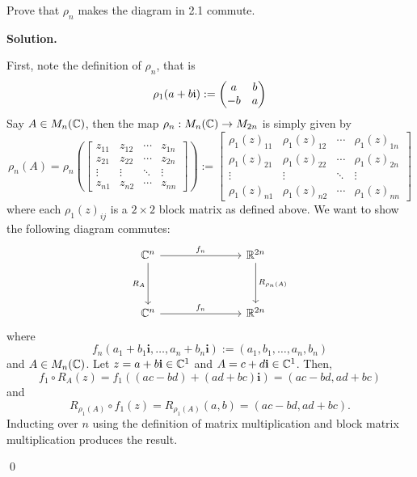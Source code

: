 \documentclass[12pt]{book}
\theoremstyle{definition}
\newenvironment{solution}
{%
  \par\noindent\textbf{Solution.}\quad
}
{%
  \qed\par
}
\begin{document}
\begin{taggedexercise}[\textcolor{green}{Complete}]
  Prove that $\rho_n$ makes the diagram in 2.1 commute.
\end{taggedexercise}

\begin{solution}
  First, note the definition of $\rho_n$, that is 
  \[\rho_1(a + b\mathfrak{i}) := \begin{pmatrix} a & b \\ -b & a \end{pmatrix}\]
  Say $A \in M_n(\mathbb{C})$, then the map $\rho_n : M_n(\mathbb{C}) \to M_{2n}$ is simply given by
  \[
\rho_n(A) = \rho_n \left(
\begin{bmatrix}
z_{11} & z_{12} & \cdots & z_{1n} \\
z_{21} & z_{22} & \cdots & z_{2n} \\
\vdots & \vdots & \ddots & \vdots \\
z_{n1} & z_{n2} & \cdots & z_{nn}
\end{bmatrix}\right) 
:= \begin{bmatrix}
  \rho_1(z)_{11} & \rho_1(z)_{12} & \cdots & \rho_1(z)_{1n} \\
  \rho_1(z)_{21} & \rho_1(z)_{22} & \cdots & \rho_1(z)_{2n} \\
  \vdots & \vdots & \ddots & \vdots \\
  \rho_1(z)_{n1} & \rho_1(z)_{n2} & \cdots & \rho_1(z)_{nn}
  \end{bmatrix}
\]
where each $\rho_1(z)_{ij}$ is a $2 \times 2$ block matrix as defined above.
We want to show the following diagram commutes:
\[\begin{tikzcd}
	{\C^n} &&& {\R^{2n}} \\
	\\
	{\C^n} &&& {\R^{2n}}
	\arrow["{f_n}", from=1-1, to=1-4]
	\arrow["{R_A}"', from=1-1, to=3-1]
	\arrow["{R_{\rho_{n}(A)}}", from=1-4, to=3-4]
	\arrow["{f_n}", from=3-1, to=3-4]
\end{tikzcd}\]
where
\[f_n(a_1 + b_1\mathbf{i}, \dots, a_n + b_n\mathbf{i}) := (a_1, b_1, \dots, a_n, b_n)\]
and $A \in M_n(\mathbb{C})$.
Let $z = a+b\mathbf{i} \in \mathbb{C}^1$ and $A = c+d\mathbf{i} \in \mathbb{C}^1$.
Then,
\[f_1 \circ R_A(z) = f_1 ((ac-bd) + (ad+bc)\mathbf{i}) = (ac-bd, ad+bc)\]
and
\[R_{\rho_{1}(A)} \circ f_1(z) = R_{\rho_{1}(A)}(a, b) = (ac-bd, ad+bc).\]
Inducting over $n$ using the definition of matrix multiplication and block matrix multiplication produces the result.

\end{solution}

\begin{taggedexercise}[\textcolor{red}{TODO}]
  
\end{taggedexercise}
\end{document}
